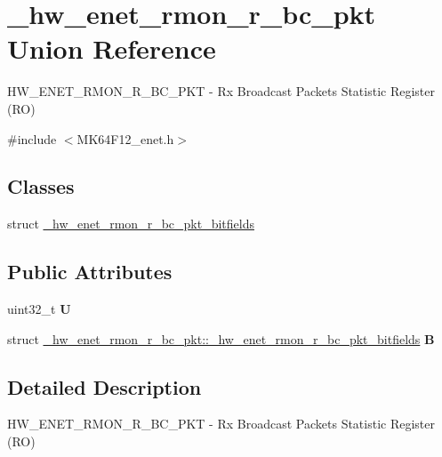 \hypertarget{union__hw__enet__rmon__r__bc__pkt}{}\section{\+\_\+hw\+\_\+enet\+\_\+rmon\+\_\+r\+\_\+bc\+\_\+pkt Union Reference}
\label{union__hw__enet__rmon__r__bc__pkt}


H\+W\+\_\+\+E\+N\+E\+T\+\_\+\+R\+M\+O\+N\+\_\+\+R\+\_\+\+B\+C\+\_\+\+P\+KT -\/ Rx Broadcast Packets Statistic Register (RO)  




{\ttfamily \#include $<$M\+K64\+F12\+\_\+enet.\+h$>$}

\subsection*{Classes}
\begin{DoxyCompactItemize}
\item 
struct \hyperlink{struct__hw__enet__rmon__r__bc__pkt_1_1__hw__enet__rmon__r__bc__pkt__bitfields}{\+\_\+hw\+\_\+enet\+\_\+rmon\+\_\+r\+\_\+bc\+\_\+pkt\+\_\+bitfields}
\end{DoxyCompactItemize}
\subsection*{Public Attributes}
\begin{DoxyCompactItemize}
\item 
uint32\+\_\+t {\bfseries U}\hypertarget{union__hw__enet__rmon__r__bc__pkt_ad17bb931b61e4860b1e2cdb88800e63b}{}\label{union__hw__enet__rmon__r__bc__pkt_ad17bb931b61e4860b1e2cdb88800e63b}

\item 
struct \hyperlink{struct__hw__enet__rmon__r__bc__pkt_1_1__hw__enet__rmon__r__bc__pkt__bitfields}{\+\_\+hw\+\_\+enet\+\_\+rmon\+\_\+r\+\_\+bc\+\_\+pkt\+::\+\_\+hw\+\_\+enet\+\_\+rmon\+\_\+r\+\_\+bc\+\_\+pkt\+\_\+bitfields} {\bfseries B}\hypertarget{union__hw__enet__rmon__r__bc__pkt_a69da3a98b1faa407a23f0d538f66179a}{}\label{union__hw__enet__rmon__r__bc__pkt_a69da3a98b1faa407a23f0d538f66179a}

\end{DoxyCompactItemize}


\subsection{Detailed Description}
H\+W\+\_\+\+E\+N\+E\+T\+\_\+\+R\+M\+O\+N\+\_\+\+R\+\_\+\+B\+C\+\_\+\+P\+KT -\/ Rx Broadcast Packets Statistic Register (RO) 

